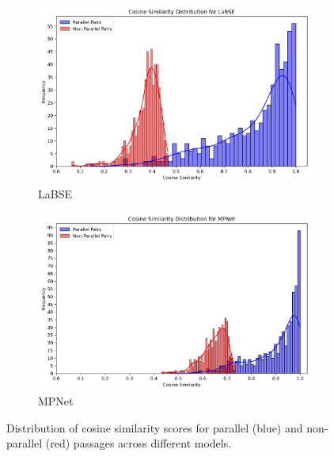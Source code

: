 \documentclass[12pt]{article}
\begin{document}
\begin{figure}[htbp]
\begin{subfigure}{0.45\textwidth}
    \centering
    \includegraphics[width=\linewidth]{nonpar_par_histogram_LaBSE.png}
    \caption{LaBSE}
    \label{fig:labse_dist}
\end{subfigure}
\hfill
\begin{subfigure}{0.45\textwidth}
    \centering
    \includegraphics[width=\linewidth]{nonpar_par_histogram_MPNet.png}
    \caption{MPNet}
    \label{fig:mpnet_dist}
\end{subfigure}

\vspace{1em}
\caption{Distribution of cosine similarity scores for parallel (blue) and non-parallel (red) passages across different models.}
\label{fig:distributions}
\end{figure}
\end{document}
